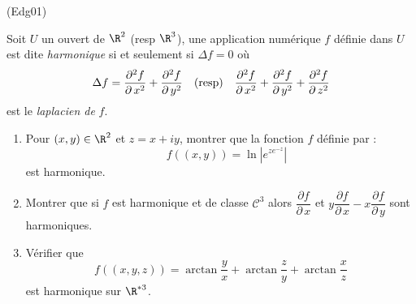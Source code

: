 \begin{tiny}(Edg01)\end{tiny}
Soit $U$ un ouvert de $\R^{2}$ (resp $\R^{3}$), une
application num{\'e}rique $f$ d{\'e}finie dans $U$ est dite \emph{harmonique} si et seulement si $\Delta f=0$ o{\`u}
\[
\Delta f=\dfrac{\partial ^{2}f}{\partial \,x^{2}}+\dfrac{\partial ^{2}f}{%
\partial \,y^{2}}\quad \text{(resp)\quad }\dfrac{\partial ^{2}f}{\partial
\,x^{2}}+\dfrac{\partial ^{2}f}{\partial \,y^{2}}+\dfrac{\partial ^{2}f}{%
\partial \,z^{2}}
\]
est le \emph{laplacien de }$f$.

\begin{enumerate}
\item  Pour $(x,y)\in \R^{2}$ et $z=x+iy$, montrer que la fonction $f$ définie par :
\begin{displaymath}
 \quad f((x,y))=\ln \left|e^{ze^{-z}}\right|
\end{displaymath}
est harmonique.
\item  Montrer que si $f$ est harmonique et de classe $\mathcal{C}^{3}$
alors $\dfrac{\partial f}{\partial \,x}$ et $y\dfrac{\partial f}{\partial \,x}%
-x\dfrac{\partial f}{\partial \,y}$ sont harmoniques.

\item  V{\'e}rifier que
\[
f((x,y,z))=\arctan \dfrac{y}{x}+\arctan \dfrac{z}{y}+\arctan \dfrac{x}{z}
\]
est harmonique sur $\R^{*3}$.
\end{enumerate}